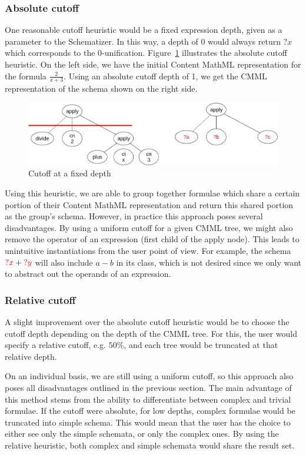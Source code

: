 \documentclass[a4paper,oneside]{article}
\def\red#1{\textcolor{red}{#1}}
\def\cmml{\textsf{Content MathML}\xspace}
\begin{document}
\subsubsection{Absolute cutoff}\label{subsubsec:absolute_cutoff}
One reasonable cutoff heuristic would be a fixed expression depth, given as a
parameter to the Schematizer. In this way, a depth of 0 would always return
$?x$ which corresponds to the 0-unification.
Figure~\ref{fig:cutoff_naive} illustrates the absolute cutoff heuristic.
On the left side, we have the initial \cmml representation for the formula
$\frac{2}{x+3}$. Using an absolute cutoff depth of 1, we get the CMML
representation of the schema shown on the right side.

\begin{figure}[ht]\centering
    \includegraphics[scale=0.3]{img/cutoff_naive.png}
    \caption{Cutoff at a fixed depth}\label{fig:cutoff_naive}
\end{figure}
\FloatBarrier

Using this heuristic, we are able to group together formulae which share a
certain portion of their \cmml representation and return this shared portion as
the group's schema. However, in practice this approach poses several
disadvantages. By using a uniform cutoff for a given CMML tree, we might also
remove the operator of an expression (first child of the \textsf{apply} node).
This leads to unintuitive instantiations from the user point of view. For
example, the schema $\red{?x} + \red{?y}$ will also include $a - b$ in its
class, which is not desired since we only want to abstract out the operands of
an expression.

\subsubsection{Relative cutoff}\label{subsubsec:relative_cutoff}
A slight improvement over the absolute cutoff heuristic would be to choose the
cutoff depth depending on the depth of the CMML tree. For this, the user would
specify a relative cutoff, e.g. $50\%$, and each tree would be truncated at
that relative depth.

On an individual basis, we are still using a uniform cutoff, so this approach
also poses all disadvantages outlined in the previous section. The main
advantage of this method stems from the ability to differentiate between
complex and trivial formulae. If the cutoff were absolute, for low depths,
complex formulae would be truncated into simple schema. This would mean that
the user has the choice to either see only the simple schemata, or only the
complex ones. By using the relative heuristic, both complex and simple schemata
would share the result set.
\end{document}
